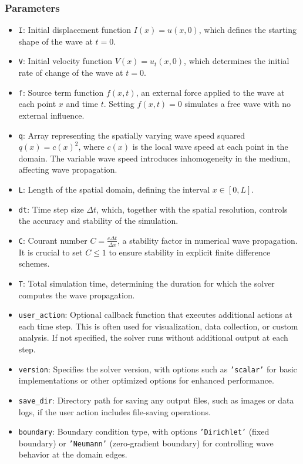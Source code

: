 \documentclass{article}
\begin{document}
		\subsubsection{Parameters}
		
		\begin{itemize}
			\item \texttt{I}: Initial displacement function \( I(x) = u(x, 0) \), which defines the starting shape of the wave at \( t = 0 \).
			\item \texttt{V}: Initial velocity function \( V(x) = u_t(x, 0) \), which determines the initial rate of change of the wave at \( t = 0 \).
			\item \texttt{f}: Source term function \( f(x, t) \), an external force applied to the wave at each point \( x \) and time \( t \). Setting \( f(x, t) = 0 \) simulates a free wave with no external influence.
			\item \texttt{q}: Array representing the spatially varying wave speed squared \( q(x) = c(x)^2 \), where \( c(x) \) is the local wave speed at each point in the domain. The variable wave speed introduces inhomogeneity in the medium, affecting wave propagation.
			\item \texttt{L}: Length of the spatial domain, defining the interval \( x \in [0, L] \).
			\item \texttt{dt}: Time step size \( \Delta t \), which, together with the spatial resolution, controls the accuracy and stability of the simulation.
			\item \texttt{C}: Courant number \( C = \frac{c \Delta t}{\Delta x} \), a stability factor in numerical wave propagation. It is crucial to set \( C \leq 1 \) to ensure stability in explicit finite difference schemes.
			\item \texttt{T}: Total simulation time, determining the duration for which the solver computes the wave propagation.
			\item \texttt{user\_action}: Optional callback function that executes additional actions at each time step. This is often used for visualization, data collection, or custom analysis. If not specified, the solver runs without additional output at each step.
			\item \texttt{version}: Specifies the solver version, with options such as \texttt{'scalar'} for basic implementations or other optimized options for enhanced performance.
			\item \texttt{save\_dir}: Directory path for saving any output files, such as images or data logs, if the user action includes file-saving operations.
			\item \texttt{boundary}: Boundary condition type, with options \texttt{'Dirichlet'} (fixed boundary) or \texttt{'Neumann'} (zero-gradient boundary) for controlling wave behavior at the domain edges.
		\end{itemize}
		
\end{document}
